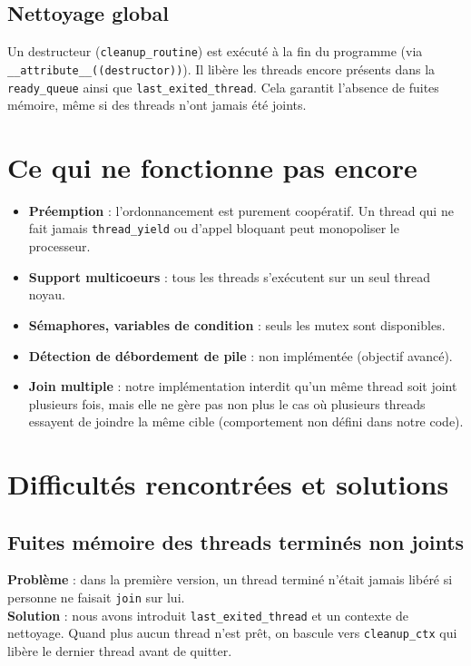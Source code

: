 \documentclass[12pt,a4paper]{article}
\begin{document}
\subsection{Nettoyage global}

Un destructeur (\texttt{cleanup\_routine}) est exécuté à la fin du programme  (via \\\texttt{\_\_attribute\_\_((destructor))}). Il libère les threads encore présents dans la \texttt{ready\_queue} ainsi que \texttt{last\_exited\_thread}. Cela garantit l’absence de fuites mémoire, même si des threads n’ont jamais été joints.

\section{Ce qui ne fonctionne pas encore}

\begin{itemize}
    \item \textbf{Préemption} : l’ordonnancement est purement coopératif. Un thread qui ne fait jamais \texttt{thread\_yield} ou d’appel bloquant peut monopoliser le processeur.
    \item \textbf{Support multicoeurs} : tous les threads s’exécutent sur un seul thread noyau.
    \item \textbf{Sémaphores, variables de condition} : seuls les mutex sont disponibles.
    \item \textbf{Détection de débordement de pile} : non implémentée (objectif avancé).
    \item \textbf{Join multiple} : notre implémentation interdit qu’un même thread soit joint plusieurs fois, mais elle ne gère pas non plus le cas où plusieurs threads essayent de joindre la même cible (comportement non défini dans notre code).
\end{itemize}

\section{Difficultés rencontrées et solutions}

\subsection{Fuites mémoire des threads terminés non joints}

\textbf{Problème} : dans la première version, un thread terminé n’était jamais libéré si personne ne faisait \texttt{join} sur lui.\\
\textbf{Solution} : nous avons introduit \texttt{last\_exited\_thread} et un contexte de nettoyage. Quand plus aucun thread n’est prêt, on bascule vers \texttt{cleanup\_ctx} qui libère le dernier thread avant de quitter.
\end{document}
